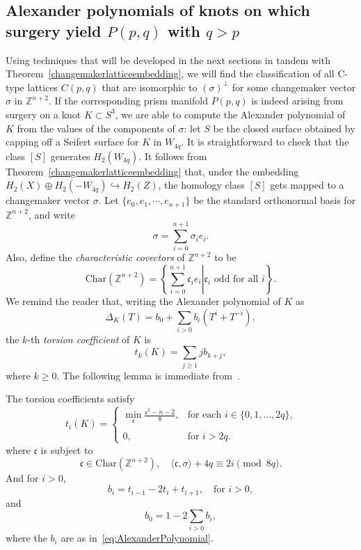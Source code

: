 \subsection{Alexander polynomials of knots on which surgery yield $P(p,q)$ with $q>p$}
Using techniques that will be developed in the next sections in tandem with Theorem~\ref{changemakerlatticeembedding}, we will find the classification of all C-type lattices $C(p,q)$ that are isomorphic to $(\sigma)^{\perp}$ for some changemaker vector $\sigma$ in $\mathbb Z^{n+2}$. If the corresponding prism manifold $P(p,q)$ is indeed arising from surgery on a knot $K \subset S^3$, we are able to compute the Alexander polynomial of $K$ from the values of the components of $\sigma$: let $S$ be the closed surface obtained by capping off a Seifert surface for $K$ in $W_{4q}$. It is straightforward to check that the class $[S]$ generates $H_2(W_{4q})$. It follows from Theorem~\ref{changemakerlatticeembedding} that, under the embedding $H_2(X)\oplus H_2(-W_{4q})\hookrightarrow H_2(Z)$, the homology class $[S]$ gets mapped to a changemaker vector $\sigma$. Let $\{e_0, e_1, \cdots, e_{n+1}\}$ be the standard orthonormal basis  for $\mathbb Z^{n+2}$, and write
\[
\sigma = \sum_{i=0}^{n+1} \sigma_i e_i.
\] 
Also, define the \textit{characteristic covectors} of $\mathbb{Z}^{n+2}$ to be 
\[
\text{Char}(\mathbb Z^{n+2})=\left \{ \left.\sum_{i=0}^{n+1}\mathfrak c_i e_i \right| \mathfrak c_i\text{ odd for all } i\right \}.
\]
We remind the reader that, writing the Alexander polynomial of $K$ as 
\begin{equation}\label{eq:AlexanderPolynomial}
\Delta_K(T)= b_0 + \sum_{i>0}b_i(T^i+T^{-i}),
\end{equation}
the $k$-th {\it torsion coefficient} of $K$ is
\[
t_k(K)= \sum_{j\ge 1}jb_{k+j},
\]
where $k\ge 0$. The following lemma is immediate from~\cite[Lemma~2.5]{Greene2015}.
\begin{lemma}\label{lem:AlexanderComputation}
The torsion coefficients satisfy
\[
t_i(K)=
\left\{
\begin{array}{cl}
\displaystyle\min_{\mathfrak c}\frac{\mathfrak c^2-n-2}8, &\text{for each $i\in\{0,1,\dots,2q\}$,}\\
&\\
0,&\text{for $i>2q$.}
\end{array}
\right.
\]
where $\mathfrak c$ is subject to 
\[
\mathfrak c\in\mathrm{Char}(\mathbb Z^{n+2}),\quad\langle\mathfrak c,\sigma\rangle+4q\equiv2i\pmod{8q}.
\]
And for $i>0$, 
\[
b_i=t_{i-1}-2t_i+t_{i+1},\quad\text{for }i>0,
\]
and
\[b_0=1-2\sum_{i>0}b_i,\]
where the $b_i$ are as in~\eqref{eq:AlexanderPolynomial}.
\end{lemma}






